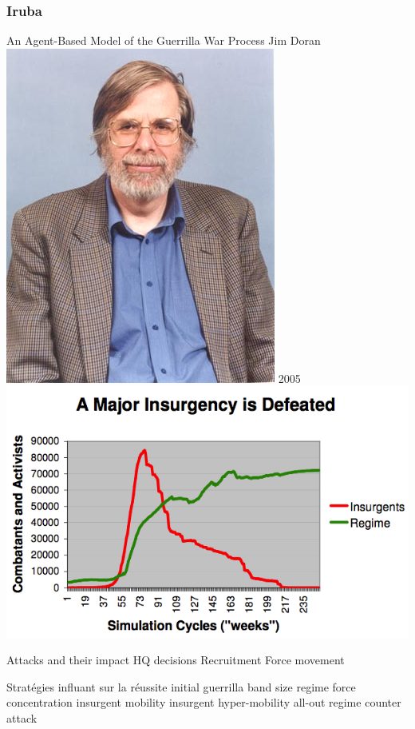 \documentclass{article}
\begin{document}
\subsubsection{Iruba}
An Agent-Based Model of the Guerrilla War Process
Jim Doran
\includegraphics[]{../ressources/doran}
2005
\includegraphics[]{../ressources/insurgency}
\begin{algorithmic}[1]
			\STATE Attacks and their impact
			\STATE HQ decisions
			\STATE Recruitment
			\STATE Force movement
		\ENDWHILE
		\end{algorithmic}
\cite{doran2005iruba}

Stratégies influant sur la réussite
initial guerrilla band size
regime force concentration
insurgent mobility
insurgent hyper-mobility
all-out regime counter attack
\end{document}
